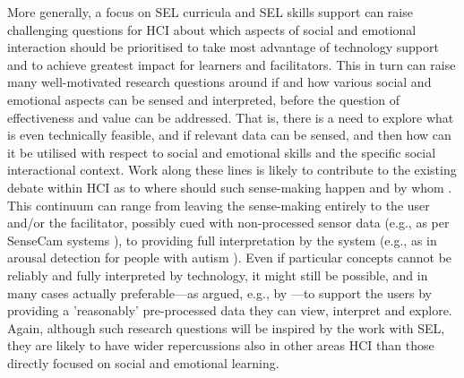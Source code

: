 \documentclass[prodmode,acmtochi]{acmsmall}
\newcommand{\Geraldine}[1]{\textrm{\textbf{\textcolor{Orange}{[[#1]]}}}}
\begin{document}
More generally, a focus on SEL curricula and SEL skills support can raise challenging questions for HCI about which aspects of social and emotional interaction should be prioritised to take most advantage of technology support and to achieve greatest impact for learners and facilitators. This in turn can raise many well-motivated research questions around if and how various social and emotional aspects can be sensed and interpreted, before the question of effectiveness and value can be addressed. That is, there is a need to explore what is even technically feasible, and if relevant data can be sensed, and then how can it be utilised with respect to social and emotional skills and the specific social interactional context.
%
Work along these lines is likely to contribute to the existing debate within HCI as to where should such sense-making happen and by whom \cite{Sengers2007,Boehner2007}. This continuum can range from leaving the sense-making entirely to the user and/or the facilitator, possibly cued with non-processed sensor data (e.g., as per SenseCam systems \cite{Fleck2009}), to providing full interpretation by the system (e.g., as in arousal detection for people with autism \cite{Picard2009}). Even if particular concepts cannot be reliably and fully interpreted by technology, it might still be possible, and in many cases actually preferable---as argued, e.g., by \cite{Boehner2005,Mentis2014}---to support the users by providing a 'reasonably' pre-processed data they can view, interpret and explore. 
%
Again, although such research questions will be inspired by the work with SEL, they are likely to have wider repercussions also in other areas HCI than those directly focused on social and emotional learning.











\end{document}
